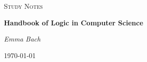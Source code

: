 \begin{titlepage}
	\centering
	{\Large \textsc{Study Notes}\par}
	\vspace{0.5cm}
	{\huge\bfseries Handbook of Logic in Computer Science\par}
    \vspace{1cm}
	{\Large\itshape Emma Bach\par}

	{\large \today\par}
\end{titlepage}
